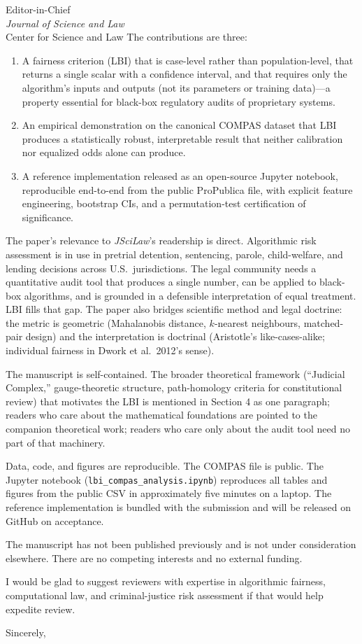 \documentclass[11pt]{letter}
\begin{document}
\begin{letter}{Editor-in-Chief\\
\emph{Journal of Science and Law}\\
Center for Science and Law}
The contributions are three:

\begin{enumerate}
\item A fairness criterion (LBI) that is case-level rather than
population-level, that returns a single scalar with a confidence
interval, and that requires only the algorithm's inputs and outputs
(not its parameters or training data)---a property essential for
black-box regulatory audits of proprietary systems.

\item An empirical demonstration on the canonical COMPAS dataset
that LBI produces a statistically robust, interpretable result that
neither calibration nor equalized odds alone can produce.

\item A reference implementation released as an open-source Jupyter
notebook, reproducible end-to-end from the public ProPublica file,
with explicit feature engineering, bootstrap CIs, and a
permutation-test certification of significance.
\end{enumerate}

The paper's relevance to \emph{JSciLaw}'s readership is direct.
Algorithmic risk assessment is in use in pretrial detention,
sentencing, parole, child-welfare, and lending decisions across
U.S.\ jurisdictions. The legal community needs a quantitative audit
tool that produces a single number, can be applied to black-box
algorithms, and is grounded in a defensible interpretation of equal
treatment. LBI fills that gap. The paper also bridges scientific
method and legal doctrine: the metric is geometric (Mahalanobis
distance, $k$-nearest neighbours, matched-pair design) and the
interpretation is doctrinal (Aristotle's like-cases-alike;
individual fairness in Dwork et al.\ 2012's sense).

The manuscript is self-contained. The broader theoretical framework
(``Judicial Complex,'' gauge-theoretic structure, path-homology
criteria for constitutional review) that motivates the LBI is
mentioned in Section 4 as one paragraph; readers who care about the
mathematical foundations are pointed to the companion theoretical
work; readers who care only about the audit tool need no part of
that machinery.

Data, code, and figures are reproducible. The COMPAS file is public.
The Jupyter notebook (\verb|lbi_compas_analysis.ipynb|) reproduces
all tables and figures from the public CSV in approximately five
minutes on a laptop. The reference implementation is bundled with
the submission and will be released on GitHub on acceptance.

The manuscript has not been published previously and is not under
consideration elsewhere. There are no competing interests and no
external funding.

I would be glad to suggest reviewers with expertise in algorithmic
fairness, computational law, and criminal-justice risk assessment if
that would help expedite review.

\closing{Sincerely,}

\end{letter}
\end{document}
